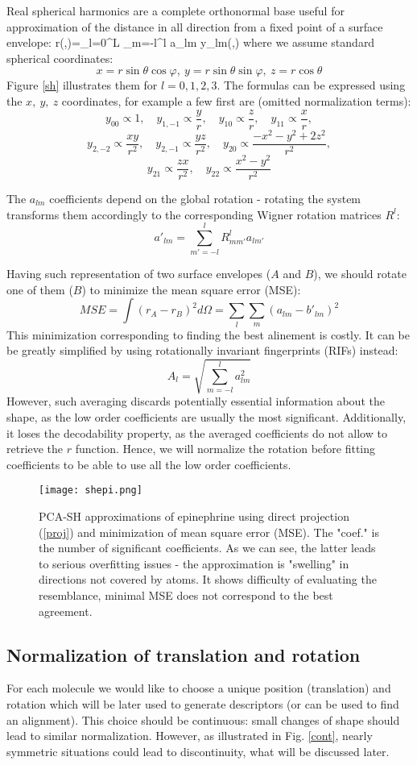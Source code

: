 \documentclass[10pt,journal]{IEEEtranTCOM}
\theoremstyle{plain}
\begin{document}
Real spherical harmonics are a complete orthonormal base useful for approximation of the distance in all direction from a fixed point of a surface envelope:
\be r(\theta,\varphi)=\sum_{l=0}^L \sum_{m=-l}^l a_{lm} y_{lm}(\theta,\varphi) \label{sheq}\ee
where we assume standard spherical coordinates:
$$x=r \sin\theta \cos \varphi,\ y=r \sin \theta \sin \varphi,\ z=r\cos \theta$$
Figure \ref{sh} illustrates them for $l=0,1,2,3$. The formulas can be expressed using the $x,\ y,\ z$ coordinates, for example a few first are (omitted normalization terms):
$$y_{00}\propto 1,\quad y_{1,-1}\propto\frac{y}{r},\quad y_{10}\propto\frac{z}{r},\quad y_{11}\propto\frac{x}{r},$$
$$y_{2,-2}\propto\frac{xy}{r^2},\quad y_{2,-1}\propto\frac{yz}{r^2},\quad y_{20}\propto\frac{-x^2-y^2+2z^2}{r^2},$$
$$y_{21}\propto\frac{zx}{r^2},\quad y_{22}\propto\frac{x^2-y^2}{r^2}$$

The $a_{lm}$ coefficients depend on the global rotation - rotating the system transforms them accordingly to the corresponding Wigner rotation matrices $R^l$:
$$a'_{lm} = \sum_{m'=-l}^l R^l_{mm'} a_{lm'}$$

Having such representation of two surface envelopes ($A$ and $B$), we should rotate one of them ($B$) to minimize the mean square error (MSE):
$$MSE=\int(r_A-r_B)^2d\Omega=\sum_l \sum_m (a_{lm}-b'_{lm})^2$$
This minimization corresponding to finding the best alinement is costly. It can be be greatly simplified by using rotationally invariant fingerprints (RIFs) instead:
$$A_l=\sqrt{\sum_{m=-l}^l a^2_{lm}}$$
However, such averaging discards potentially essential information about the shape, as the low order coefficients are usually the most significant. Additionally, it loses the decodability property, as the averaged coefficients do not allow to retrieve the $r$ function. Hence, we will normalize the rotation before fitting coefficients to be able to use all the low order coefficients.
\begin{figure*}[t!]
    \centering
        \texttt{[image: shepi.png]}
        \caption{PCA-SH approximations of epinephrine using direct projection (\ref{proj}) and minimization of mean square error (MSE). The "coef." is the number of significant coefficients. As we can see, the latter leads to serious overfitting issues - the approximation is "swelling" in directions not covered by atoms. It shows difficulty of evaluating the resemblance, minimal MSE does not correspond to the best agreement. }
        \label{shepi}
\end{figure*}
\subsection{Normalization of translation and rotation} \label{normal}
For each molecule we would like to choose a unique position (translation) and rotation which will be later used to generate descriptors (or can be used to find an alignment).
This choice should be continuous: small changes of shape should lead to similar normalization. However, as illustrated in Fig. \ref{cont}, nearly symmetric situations could lead to discontinuity, what will be discussed later.
\end{document}
